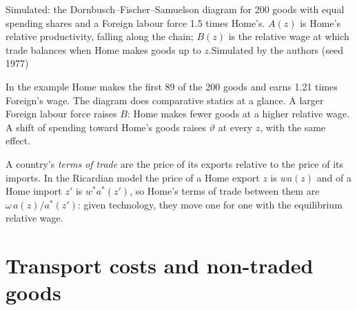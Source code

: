 \begin{omchart}{Simulated: the Dornbusch--Fischer--Samuelson diagram for 200
goods with equal spending shares and a Foreign labour force 1.5 times Home's.
$A(z)$ is Home's relative productivity, falling along the chain; $B(z)$ is the
relative wage at which trade balances when Home makes goods up to $z$.}{Simulated
by the authors (seed 1977)}
\end{omchart}

In the example Home makes the first 89 of the 200 goods and earns 1.21 times
Foreign's wage. %
The diagram does comparative statics at a glance. A larger Foreign labour force
raises $B$: Home makes fewer goods at a higher relative wage. A shift of
spending toward Home's goods raises $\vartheta$ at every $z$, with the same effect.

\begin{definition}\label{def:b3:ricardian-trade:terms-of-trade}
A country's \emph{terms of trade} are the price of its exports relative to the
price of its imports. In the Ricardian model the price of a Home export $z$ is
$w a(z)$ and of a Home import $z'$ is $w^* a^*(z')$, so Home's terms of trade
between them are $\omega\, a(z)/a^*(z')$: given technology, they move one for one
with the equilibrium relative wage.
\end{definition}

\section{Transport costs and non-traded goods}\label{sec:b3:ricardian-trade:iceberg}

